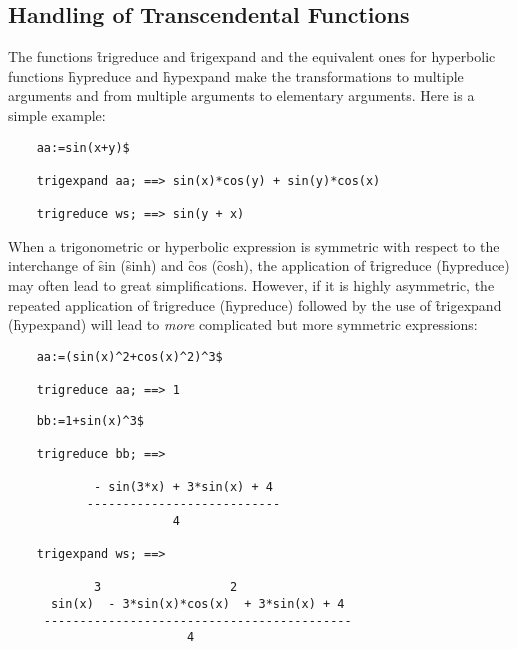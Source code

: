 \subsection{Handling of Transcendental Functions}
\hypertarget{operator:TRIGEXPAND}{}
\hypertarget{operator:TRIGREDUCE}{}
\hypertarget{operator:HYPEXPAND}{}
\hypertarget{operator:HYPREDUCE}{}
The functions \f{trigreduce} and \f{trigexpand} and the equivalent
ones for hyperbolic functions \f{hypreduce} and \f{hypexpand}
make the transformations to multiple arguments and from
multiple arguments to elementary arguments. Here is a simple example:
\begin{verbatim}
    aa:=sin(x+y)$

    trigexpand aa; ==> sin(x)*cos(y) + sin(y)*cos(x)

    trigreduce ws; ==> sin(y + x)
\end{verbatim}
When a trigonometric or hyperbolic expression is symmetric with
respect to the interchange of \f{sin} (\f{sinh}) and \f{cos} (\f{cosh}),
the application of \f{trigreduce} (\f{hypreduce}) may often lead to great
simplifications. However, if it is highly asymmetric, the repeated
application of \f{trigreduce} (\f{hypreduce}) followed by the use of
\f{trigexpand} (\f{hypexpand}) will lead to \emph{more} complicated
but more symmetric expressions:
\begin{verbatim}
    aa:=(sin(x)^2+cos(x)^2)^3$

    trigreduce aa; ==> 1
\end{verbatim}
\begin{verbatim}
    bb:=1+sin(x)^3$

    trigreduce bb; ==>

            - sin(3*x) + 3*sin(x) + 4
           ---------------------------
                       4

    trigexpand ws; ==>

            3                  2
      sin(x)  - 3*sin(x)*cos(x)  + 3*sin(x) + 4
     -------------------------------------------
                         4
\end{verbatim}

